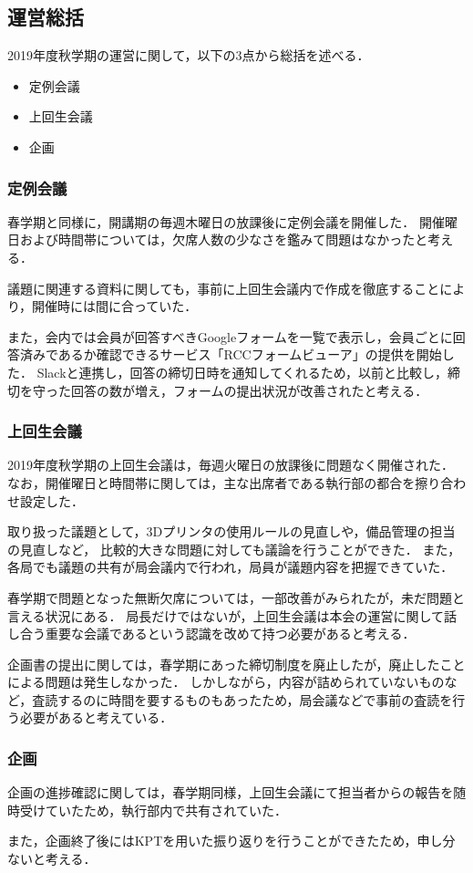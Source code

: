\subsection*{運営総括}
2019年度秋学期の運営に関して，以下の3点から総括を述べる．
\begin{itemize}
    \item 定例会議
    \item 上回生会議
    \item 企画
\end{itemize}

\subsubsection*{定例会議}
春学期と同様に，開講期の毎週木曜日の放課後に定例会議を開催した．
開催曜日および時間帯については，欠席人数の少なさを鑑みて問題はなかったと考える．

議題に関連する資料に関しても，事前に上回生会議内で作成を徹底することにより，開催時には間に合っていた．

また，会内では会員が回答すべきGoogleフォームを一覧で表示し，会員ごとに回答済みであるか確認できるサービス「RCCフォームビューア」の提供を開始した．
Slackと連携し，回答の締切日時を通知してくれるため，以前と比較し，締切を守った回答の数が増え，フォームの提出状況が改善されたと考える．

\subsubsection*{上回生会議}
2019年度秋学期の上回生会議は，毎週火曜日の放課後に問題なく開催された．
なお，開催曜日と時間帯に関しては，主な出席者である執行部の都合を擦り合わせ設定した．

取り扱った議題として，3Dプリンタの使用ルールの見直しや，備品管理の担当の見直しなど，
比較的大きな問題に対しても議論を行うことができた．
また，各局でも議題の共有が局会議内で行われ，局員が議題内容を把握できていた．

春学期で問題となった無断欠席については，一部改善がみられたが，未だ問題と言える状況にある．
局長だけではないが，上回生会議は本会の運営に関して話し合う重要な会議であるという認識を改めて持つ必要があると考える．

企画書の提出に関しては，春学期にあった締切制度を廃止したが，廃止したことによる問題は発生しなかった．
しかしながら，内容が詰められていないものなど，査読するのに時間を要するものもあったため，局会議などで事前の査読を行う必要があると考えている．

\subsubsection*{企画}
企画の進捗確認に関しては，春学期同様，上回生会議にて担当者からの報告を随時受けていたため，執行部内で共有されていた．

また，企画終了後にはKPTを用いた振り返りを行うことができたため，申し分ないと考える．
